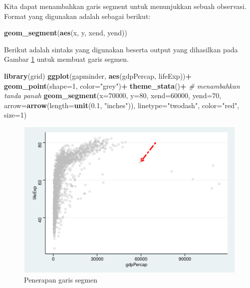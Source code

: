 \documentclass[]{book}
\newenvironment{Shaded}{\begin{snugshade}}{\end{snugshade}}
\newcommand{\KeywordTok}[1]{\textcolor[rgb]{0.13,0.29,0.53}{\textbf{#1}}}
\newcommand{\DataTypeTok}[1]{\textcolor[rgb]{0.13,0.29,0.53}{#1}}
\newcommand{\DecValTok}[1]{\textcolor[rgb]{0.00,0.00,0.81}{#1}}
\newcommand{\FloatTok}[1]{\textcolor[rgb]{0.00,0.00,0.81}{#1}}
\newcommand{\StringTok}[1]{\textcolor[rgb]{0.31,0.60,0.02}{#1}}
\newcommand{\CommentTok}[1]{\textcolor[rgb]{0.56,0.35,0.01}{\textit{#1}}}
\newcommand{\OperatorTok}[1]{\textcolor[rgb]{0.81,0.36,0.00}{\textbf{#1}}}
\newcommand{\NormalTok}[1]{#1}
\begin{document}
Kita dapat menambahkan garis segment untuk menunjukkan sebuah observasi.
Format yang digunakan adalah sebagai berikut:

\begin{Shaded}
\begin{Highlighting}[]
\KeywordTok{geom_segment}\NormalTok{(}\KeywordTok{aes}\NormalTok{(x, y, xend, yend))}
\end{Highlighting}
\end{Shaded}

Berikut adalah sintaks yang digunakan beserta output yang dihasilkan
pada Gambar \ref{fig:ggsegment} untuk membuat garis segmen.

\begin{Shaded}
\begin{Highlighting}[]
\KeywordTok{library}\NormalTok{(grid)}
\KeywordTok{ggplot}\NormalTok{(gapminder, }\KeywordTok{aes}\NormalTok{(gdpPercap, lifeExp))}\OperatorTok{+}
\StringTok{  }\KeywordTok{geom_point}\NormalTok{(}\DataTypeTok{shape=}\DecValTok{1}\NormalTok{, }\DataTypeTok{color=}\StringTok{"grey"}\NormalTok{)}\OperatorTok{+}
\StringTok{  }\KeywordTok{theme_stata}\NormalTok{()}\OperatorTok{+}
\StringTok{  }\CommentTok{# menambahkan tanda panah}
\StringTok{  }\KeywordTok{geom_segment}\NormalTok{(}\DataTypeTok{x=}\DecValTok{70000}\NormalTok{, }\DataTypeTok{y=}\DecValTok{80}\NormalTok{,}
                   \DataTypeTok{xend=}\DecValTok{60000}\NormalTok{, }\DataTypeTok{yend=}\DecValTok{70}\NormalTok{,}
                   \DataTypeTok{arrow=}\KeywordTok{arrow}\NormalTok{(}\DataTypeTok{length=}\KeywordTok{unit}\NormalTok{(}\FloatTok{0.1}\NormalTok{, }\StringTok{"inches"}\NormalTok{)),}
               \DataTypeTok{linetype=}\StringTok{"twodash"}\NormalTok{,}
               \DataTypeTok{color=}\StringTok{"red"}\NormalTok{,}
               \DataTypeTok{size=}\DecValTok{1}\NormalTok{)}
\end{Highlighting}
\end{Shaded}

\begin{figure}

{\centering \includegraphics[width=0.7\linewidth]{EnvStat_files/figure-latex/ggsegment-1} 

}

\caption{Penerapan garis segmen}\label{fig:ggsegment}
\end{figure}
\end{document}
